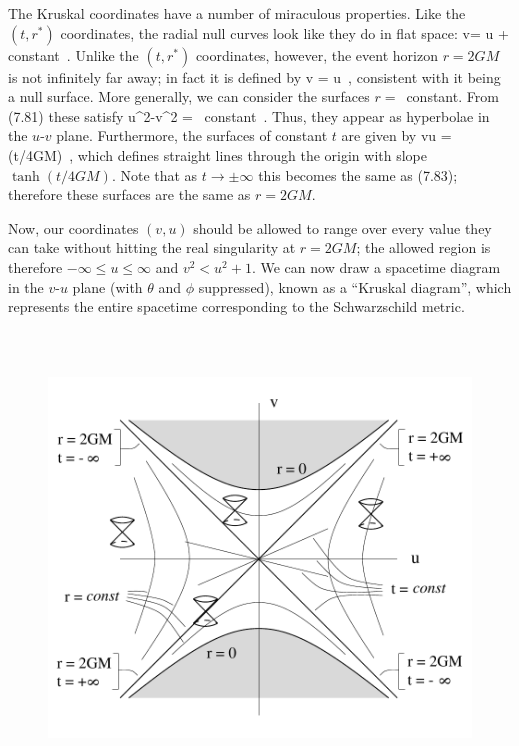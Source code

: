 \documentclass[12pt]{article}
\begin{document}
The Kruskal coordinates have a number of miraculous properties.
Like the $(t,r^*)$ coordinates, the radial null curves look like
they do in flat space:
\be
  v= \pm u + {\rm constant}\ .\label{7.82}
\ee
Unlike the $(t,r^*)$ coordinates, however, the event horizon $r=2GM$ 
is not infinitely far away; in fact it is defined by
\be
  v = \pm u\ ,\label{7.83}
\ee
consistent with it being a null surface.
More generally, we can consider the surfaces $r=$~constant.  From
(7.81) these satisfy
\be
  u^2-v^2 = {\rm ~constant}\ .\label{7.84}
\ee
Thus, they appear as hyperbolae in the $u$-$v$ plane.  Furthermore,
the surfaces of constant $t$ are given by
\be
  {v\over u} = \tanh(t/4GM)\ ,\label{7.85}
\ee
which defines straight lines through the origin with slope
$\tanh(t/4GM)$.  Note that as $t\rightarrow \pm\infty$ this
becomes the same as (7.83); therefore these surfaces are the
same as $r=2GM$.   

Now, our coordinates $(v,u)$ should be allowed to
range over every value they can take without hitting the real
singularity at $r=2GM$; the allowed region is therefore
$-\infty \leq u \leq \infty$ and $v^2 < u^2+1$.  We can now draw
a spacetime diagram in the $v$-$u$ plane (with $\theta$ and $\phi$
suppressed), known as a ``Kruskal diagram'', which represents the
entire spacetime corresponding to the Schwarzschild metric.

\begin{figure}[h]
  \centerline{
  \includegraphics[height=12cm]{pdf/seven14}}
\end{figure}
\end{document}
